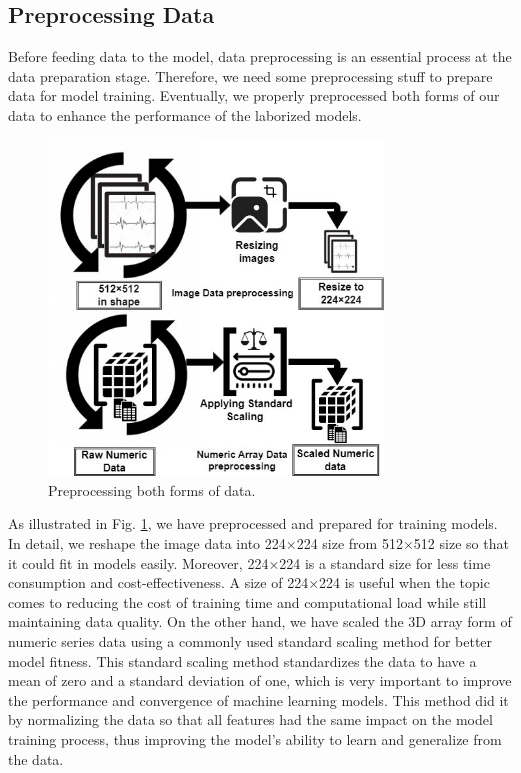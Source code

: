\documentclass[conference]{IEEEtran}
\begin{document}
\subsection{Preprocessing Data}

Before feeding data to the model, data preprocessing is an essential process at the data preparation stage. Therefore, we need some preprocessing stuff to prepare data for model training. Eventually, we properly preprocessed both forms of our data to enhance the performance of the laborized models.

\begin{figure}[htbp]
\centerline{\includegraphics[width=3.5in]{6-Preprocessing Data.jpg}}
\caption{Preprocessing both forms of data.}
\label{fig-6:Preprocess Data}
\end{figure}

As illustrated in Fig. \ref{fig-6:Preprocess Data}, we have preprocessed and prepared for training models. In detail, we reshape the image data into 224$\times$224 size from  512$\times$512 size so that it could fit in models easily. Moreover, 224$\times$224 is a standard size for less time consumption and cost-effectiveness. A size of 224$\times$224 is useful when the topic comes to reducing the cost of training time and computational load while still maintaining data quality. On the other hand, we have scaled the 3D array form of numeric series data using a commonly used standard scaling method for better model fitness. This standard scaling method standardizes the data to have a mean of zero and a standard deviation of one, which is very important to improve the performance and convergence of machine learning models. This method did it by normalizing the data so that all features had the same impact on the model training process, thus improving the model's ability to learn and generalize from the data.
\end{document}
